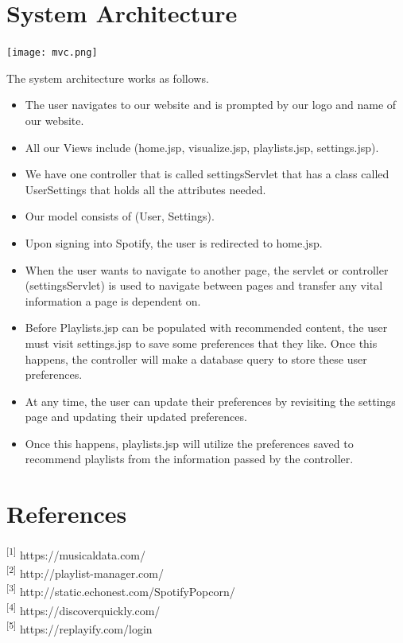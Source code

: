 \documentclass[letter, 11pt]{article}
\begin{document}
\section*{System Architecture}

\texttt{[image: mvc.png]}

The system architecture works as follows.
\begin{itemize}
    \item The user navigates to our website and is prompted by our logo and name of our website.
    \item All our Views include (home.jsp, visualize.jsp, playlists.jsp, settings.jsp).
    \item We have one controller that is called settingsServlet that has a class called UserSettings that holds all the attributes needed.
    \item Our model consists of (User, Settings).
    \item Upon signing into Spotify, the user is redirected to home.jsp.
    \item When the user wants to navigate to another page, the servlet or controller (settingsServlet) is used to navigate between pages and transfer any vital information a page is dependent on.
    \item Before Playlists.jsp can be populated with recommended content, the user must visit settings.jsp to save some preferences that they like. Once this happens, the controller will make a database query to store these user preferences.
    \item At any time, the user can update their preferences by revisiting the settings page and updating their updated preferences.
    \item Once this happens, playlists.jsp will utilize the preferences saved to recommend playlists from the information passed by the controller.
\end{itemize}






\section*{References}

\noindent
{\textsuperscript{[1]} https://musicaldata.com/} \\
{\textsuperscript{[2]} http://playlist-manager.com/} \\
{\textsuperscript{[3]} http://static.echonest.com/SpotifyPopcorn/}\\
{\textsuperscript{[4]} https://discoverquickly.com/}\\
{\textsuperscript{[5]} https://replayify.com/login}
\end{document}
